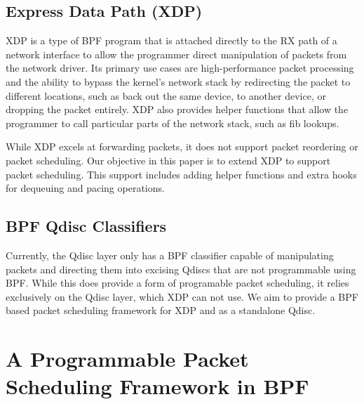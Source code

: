 \documentclass[sigconf, nonacm]{acmart}
\begin{document}
\subsection{Express Data Path (XDP)}

XDP\cite{hoiland2018express} is a type of BPF program that is attached directly to the RX path of a network interface to allow the programmer direct manipulation of packets from the network driver. Its primary use cases are high-performance packet processing and the ability to bypass the kernel's network stack by redirecting the packet to different locations, such as back out the same device, to another device, or dropping the packet entirely. XDP also provides helper functions that allow the programmer to call particular parts of the network stack, such as fib lookups.

While XDP excels at forwarding packets, it does not support packet reordering or packet scheduling. Our objective in this paper is to extend XDP to support packet scheduling. This support includes adding helper functions and extra hooks for dequeuing and pacing operations.


\subsection{BPF Qdisc Classifiers}

Currently, the Qdisc layer only has a BPF classifier capable of manipulating packets and directing them into excising Qdiscs that are not programmable using BPF. While this does provide a form of programable packet scheduling, it relies exclusively on the Qdisc layer, which XDP can not use. We aim to provide a BPF based packet scheduling framework for XDP and as a standalone Qdisc.


\section{A Programmable Packet Scheduling Framework in BPF}
\end{document}
